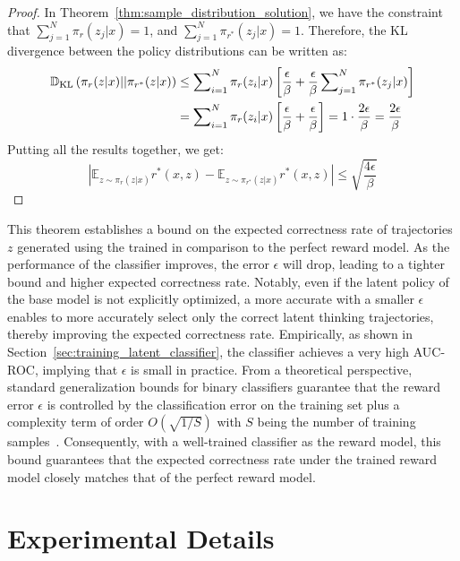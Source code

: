 \documentclass{article} %
\begin{document}
\begin{proof}
In Theorem~\ref{thm:sample_distribution_solution}, we have the constraint that $\sum^{N}_{j=1}\pi_{r}(z_j|x)=1$, and $\sum^{N}_{j=1}\pi_{r^{*}}(z_j|x)=1$. Therefore, the KL divergence between the policy distributions can be written as:
\begin{align*}
\mathbb{D}_{\textrm{KL}}\left(\pi_{r}(z|x)||\pi_{r^{*}}(z|x)\right)&\leq\sum\nolimits^{N}_{i=1}\pi_{r}(z_i|x)\left[\frac{\epsilon}{\beta}+\frac{\epsilon}{\beta}\sum\nolimits^{N}_{j=1}\pi_{r^{*}}(z_j|x)\right]\\
&=\sum\nolimits^{N}_{i=1}\pi_{r}(z_i|x)\left[\frac{\epsilon}{\beta}+\frac{\epsilon}{\beta}\right]=1\cdot\frac{2\epsilon}{\beta}=\frac{2\epsilon}{\beta}
\end{align*}
Putting all the results together, we get:
\begin{equation*}
    |\mathbb{E}_{z\sim\pi_{r}(z|x)}r^{*}(x,z)-\mathbb{E}_{z\sim\pi_{r^{*}}(z|x)}r^{*}(x,z)|\leq\sqrt{\frac{4\epsilon}{\beta}}
\end{equation*}
\end{proof}
This theorem establishes a bound on the expected correctness rate of trajectories $z$ generated using the trained \LRM in comparison to the perfect reward model. As the performance of the classifier improves, the error $\epsilon$ will drop, leading to a tighter bound and higher expected correctness rate.
%
Notably, even if the latent policy of the base model is not explicitly optimized, a more accurate \LRM with a smaller $\epsilon$ enables \LTO to more accurately select only the correct latent thinking trajectories, thereby improving the expected correctness rate.
%
Empirically, as shown in Section~\ref{sec:training_latent_classifier}, the classifier achieves a very high AUC-ROC, implying that $\epsilon$ is small in practice. 
%
From a theoretical perspective, standard generalization bounds for binary classifiers guarantee that the reward error $\epsilon$ is controlled by the classification error on the training set plus a complexity term of order $O(\sqrt{1/S})$ with $S$ being the number of training samples~\citep{bartlett2002rademacher, bartlett2017spectrally}.
%
Consequently, with a well-trained classifier as the reward model, this bound guarantees that the expected correctness rate under the trained reward model closely matches that of the perfect reward model.
\section{Experimental Details}
\end{document}
